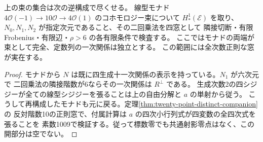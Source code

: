 \begin{corollary}\label{cor:instanton-window-reconstruction}
上の束の集合は次の逆構成で尽くせる。
線型モナド $4\mathcal O(-1)\to10\mathcal O\to4\mathcal O(1)$ のコホモロジー束について
$H^1_*(\mathcal E)$ を取り、$N_0,N_1,N_2$ が指定次元であること、その二回乗法を四窓として
隣接切断・有限Frobenius・有限辺・$\rho>6$ の各有限条件で検査する。
ここではモナドの両端が束として完全、定数列の一次関係は独立とする。
この範囲には全次数正則な窓が実在する。
\end{corollary}
\begin{proof}
モナドから $N$ は既に四生成十一次関係の表示を持っている。$N_1$ が六次元で
二回乗法の隣接階数が6ならその一次関係は $R^\perp$ である。
生成次数2の四シジジーが全ての線型シジジーを張ることは上の自由分解と $a$ の単射から従う。
こうして再構成したモナドも元に戻る。定理\ref{thm:twenty-point-distinct-companion}の
反対階数10の正則窓で、付属計算は $a$ の四次小行列式が四変数の全四次式を張ることを
素数1009で検証する。従って標数零でも共通射影零点はなく、この開部分は空でない。
\end{proof}
